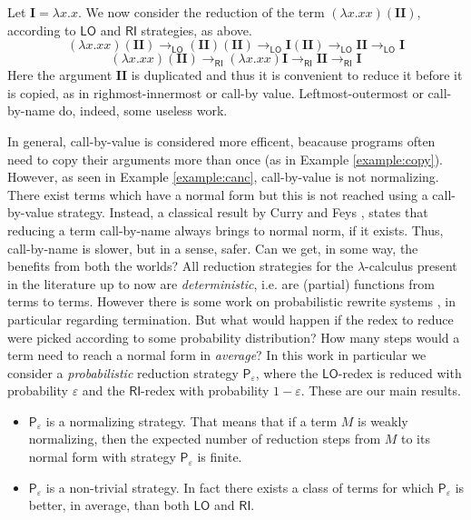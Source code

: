 \documentclass[english]{llncs}
\newcommand{\termone}{M}
\newcommand{\redlo}{\longrightarrow_\pslo}
\newcommand{\redri}{\longrightarrow_\psri}
\newcommand{\pslo}{\mathsf{LO}}
\newcommand{\psri}{\mathsf{RI}}
\begin{document}
\begin{example}\label{example:copy}
	Let $\bm{I}=\lambda x.x$. We now consider the reduction of the term $(\lambda x.xx)(\bm{II})$, according to $\pslo$ and $\psri$ strategies, as above.
	$$
	(\lambda x.xx)(\bm{II}) \redlo (\bm{II})(\bm{II}) \redlo \bm{I}(\bm{II}) \redlo \bm{II} \redlo \bm{I}
	$$
	$$
	(\lambda x.xx)(\bm{II}) \redri (\lambda x.xx)\bm{I} \redri \bm{II} \redri \bm{I}
	$$
	Here the argument $\bm{II}$ is duplicated and thus it is convenient to reduce it before it is copied, as in righmost-innermost or call-by value. Leftmost-outermost or call-by-name do, indeed, some useless work.
\end{example}
In general, call-by-value is considered more efficent, beacause programs often need to copy their arguments more than once (as in Example \ref{example:copy}). However, as seen in Example \ref{example:canc}, call-by-value is not normalizing. There exist terms which have a normal form but this is not reached using a call-by-value strategy. Instead, a classical result by Curry and Feys \cite{curry_combinatory_1958}, states that reducing a term call-by-name always brings to normal norm, if it exists. Thus, call-by-name is slower, but in a sense, safer. Can we get, in some way, the benefits from both the worlds? 
All reduction strategies for the $\lambda$-calculus present in the literature up to now are \emph{deterministic}, i.e. are (partial) functions from terms to terms. However there is some work on probabilistic rewrite systems \cite{bournez_proving_2005,ferrer_fioriti_probabilistic_2015,avanzini_probabilistic_2018}, in particular regarding termination. But what would happen if the redex to reduce were picked according to some probability distribution? How many steps would a term need to reach a normal form in \emph{average}? In this work in particular we consider a \emph{probabilistic} reduction strategy $\mathsf{P}_\varepsilon$, where the $\pslo$-redex is reduced with probability $\varepsilon$ and the $\psri$-redex with probability $1-\varepsilon$. These are our main results.
\begin{itemize}
	\item $\mathsf{P}_\varepsilon$ is a normalizing strategy. That means that if a term $\termone$ is weakly normalizing, then the expected number of reduction steps from $\termone$ to its normal form with strategy $\mathsf{P}_\varepsilon$ is finite.
	\item $\mathsf{P}_\varepsilon$ is a non-trivial strategy. In fact there exists a class of terms for which $\mathsf{P}_\varepsilon$ is better, in average, than both $\pslo$ and $\psri$.
\end{itemize}


\end{document}
